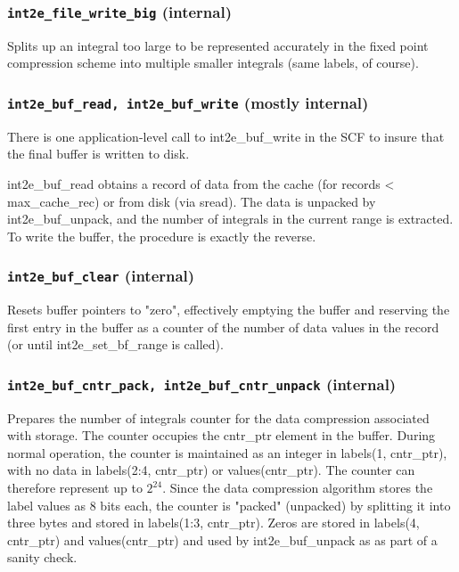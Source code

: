 \subsubsection{{\tt int2e\_file\_write\_big} (internal)}

Splits up an integral too large to be represented accurately in the
fixed point compression scheme into multiple smaller integrals (same
labels, of course).

\subsubsection{{\tt int2e\_buf\_read, int2e\_buf\_write} (mostly internal)}

There is one application-level call to int2e\_buf\_write in
the SCF to insure that the final buffer is written to disk.

int2e\_buf\_read obtains a record of data from the cache (for records <
max\_cache\_rec) or from disk (via sread). The data is unpacked by
int2e\_buf\_unpack, and the number of integrals in the current range is
extracted. To write the buffer, the procedure is exactly the reverse.

\subsubsection{{\tt int2e\_buf\_clear} (internal)}

Resets buffer pointers to "zero", effectively emptying the buffer and
reserving the first entry in the buffer as a counter of the number of
data values in the record (or until int2e\_set\_bf\_range is called).

\subsubsection{{\tt int2e\_buf\_cntr\_pack, int2e\_buf\_cntr\_unpack} (internal)}

Prepares the number of integrals counter for the data compression
associated with storage.  The counter occupies the cntr\_ptr element in
the buffer.  During normal operation, the counter is maintained as an
integer in labels(1, cntr\_ptr), with no data in labels(2:4, cntr\_ptr)
or values(cntr\_ptr).  The counter can therefore represent up to
$2^{24}$. Since the data compression algorithm stores the label values as
8 bits each, the counter is "packed" (unpacked) by splitting it into
three bytes and stored in labels(1:3, cntr\_ptr).  Zeros are stored in
labels(4, cntr\_ptr) and values(cntr\_ptr) and used by int2e\_buf\_unpack
as as part of a sanity check.

